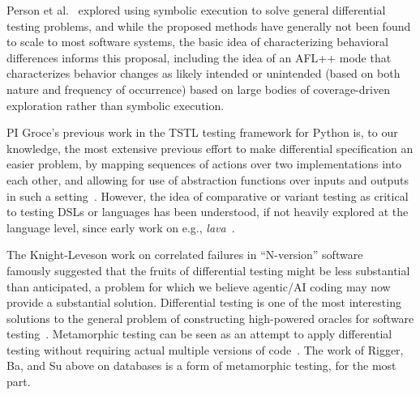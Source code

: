 Person et al.~\cite{Person2008DSE} explored using symbolic execution
to solve general differential testing problems, and while the proposed
methods have generally not been found to scale to most software
systems, the basic idea of characterizing behavioral differences
informs this proposal, including the idea of an AFL++ mode that
characterizes behavior changes as likely intended or unintended (based on both nature and
frequency of occurrence) based on large bodies of coverage-driven
exploration rather than symbolic execution.

PI Groce's previous work in
the TSTL testing framework for Python is, to our knowledge, the most
extensive previous effort to make differential specification an easier
problem, by mapping sequences of actions over two implementations into
each other, and allowing for use of abstraction functions over inputs
and outputs in such a setting~\cite{ISSTA15,tstl}.  However, the idea
of comparative or variant testing as critical to testing DSLs or
languages has been understood, if not heavily explored at the language
level, since early work on e.g., \emph{lava}~\cite{Sirer1999Lava}.

The Knight-Leveson work on
correlated failures in ``N-version'' software~\cite{KNIGHT1985159} famously suggested that
the fruits of differential testing might be less substantial than
anticipated, a problem for which we believe agentic/AI coding may now provide a
substantial solution.  Differential testing is one of the most
interesting solutions to the general problem of constructing
high-powered oracles for software testing~\cite{Barr2015}.
Metamorphic testing can be seen as an attempt to apply differential
testing without requiring actual multiple versions of
code~\cite{Segura2016}. The work of Rigger, Ba, and Su above on
databases is a form of metamorphic testing, for the most part.